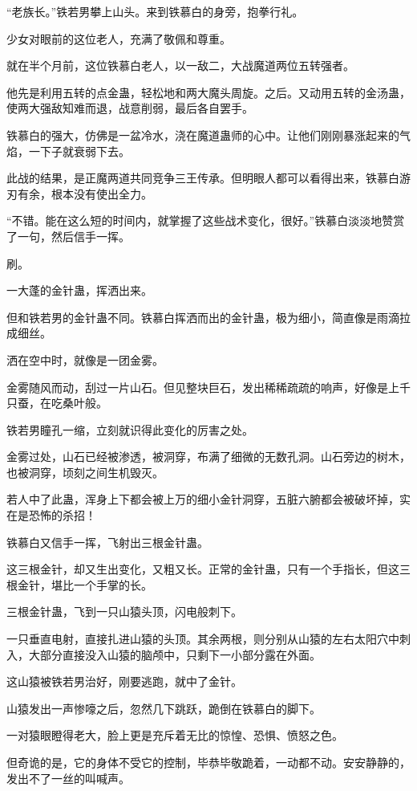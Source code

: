 \begin{this_body}
“老族长。”铁若男攀上山头。来到铁慕白的身旁，抱拳行礼。

少女对眼前的这位老人，充满了敬佩和尊重。

就在半个月前，这位铁慕白老人，以一敌二，大战魔道两位五转强者。

他先是利用五转的点金蛊，轻松地和两大魔头周旋。之后。又动用五转的金汤蛊，使两大强敌知难而退，战意削弱，最后各自罢手。

铁慕白的强大，仿佛是一盆冷水，浇在魔道蛊师的心中。让他们刚刚暴涨起来的气焰，一下子就衰弱下去。

此战的结果，是正魔两道共同竞争三王传承。但明眼人都可以看得出来，铁慕白游刃有余，根本没有使出全力。

“不错。能在这么短的时间内，就掌握了这些战术变化，很好。”铁慕白淡淡地赞赏了一句，然后信手一挥。

刷。

一大蓬的金针蛊，挥洒出来。

但和铁若男的金针蛊不同。铁慕白挥洒而出的金针蛊，极为细小，简直像是雨滴拉成细丝。

洒在空中时，就像是一团金雾。

金雾随风而动，刮过一片山石。但见整块巨石，发出稀稀疏疏的响声，好像是上千只蚕，在吃桑叶般。

铁若男瞳孔一缩，立刻就识得此变化的厉害之处。

金雾过处，山石已经被渗透，被洞穿，布满了细微的无数孔洞。山石旁边的树木，也被洞穿，顷刻之间生机毁灭。

若人中了此蛊，浑身上下都会被上万的细小金针洞穿，五脏六腑都会被破坏掉，实在是恐怖的杀招！

铁慕白又信手一挥，飞射出三根金针蛊。

这三根金针，却又生出变化，又粗又长。正常的金针蛊，只有一个手指长，但这三根金针，堪比一个手掌的长。

三根金针蛊，飞到一只山猿头顶，闪电般刺下。

一只垂直电射，直接扎进山猿的头顶。其余两根，则分别从山猿的左右太阳穴中刺入，大部分直接没入山猿的脑颅中，只剩下一小部分露在外面。

这山猿被铁若男治好，刚要逃跑，就中了金针。

山猿发出一声惨嚎之后，忽然几下跳跃，跪倒在铁慕白的脚下。

一对猿眼瞪得老大，脸上更是充斥着无比的惊惶、恐惧、愤怒之色。

但奇诡的是，它的身体不受它的控制，毕恭毕敬跪着，一动都不动。安安静静的，发出不了一丝的叫喊声。


\end{this_body}
